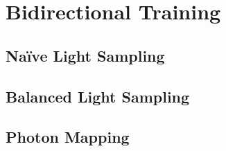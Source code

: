 
\chapter{Bidirectional Training}
\label{chap:bidirectional_training}

\section{Na\"ive Light Sampling}

\section{Balanced Light Sampling}

\section{Photon Mapping}